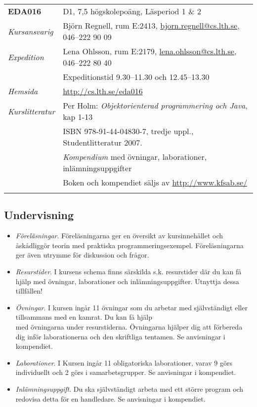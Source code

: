 \begin{longtable}[c]{@{}ll@{}}
\toprule\addlinespace
\textbf{EDA016} & D1, 7,5 högskolepoäng, Läsperiod 1 \& 2
\\\addlinespace
\midrule\endhead
\emph{Kursansvarig} & Björn Regnell, rum E:2413,
\href{mailto:bjorn.regnell@cs.lth.se}{bjorn.regnell@cs.lth.se}, 046--222
90 09
\\\addlinespace
\emph{Expedition} & Lena Ohlsson, rum E:2179,
\href{mailto:lena.ohlsson@cs.lth.se}{lena.ohlsson@cs.lth.se}, 046--222
80 40
\\\addlinespace
& Expeditionstid 9.30--11.30 och 12.45--13.30
\\\addlinespace
\emph{Hemsida} & \url{http://cs.lth.se/eda016}
\\\addlinespace
\emph{Kurslitteratur} & Per Holm: \emph{Objektorienterad programmering
och Java}, kap 1-13
\\\addlinespace
& ISBN 978-91-44-04830-7, tredje uppl., Studentlitteratur 2007.
\\\addlinespace
& \emph{Kompendium} med övningar, laborationer, inlämningsuppgifter
\\\addlinespace
& Boken och kompendiet säljs av \url{http://www.kfsab.se/}
\\\addlinespace
\bottomrule
\end{longtable}

\subsection{Undervisning}\label{undervisning}

\begin{itemize}
\item
  \emph{Föreläsningar}. Föreläsningarna ger en översikt av
  kursinnehållet och åskådliggör teorin med praktiska
  programmeringsexempel. Föreläsningarna ger även utrymme för diskussion
  och frågor.
\item
  \emph{Resurstider}. I kursens schema finns särskilda s.k. resurstider
  där du kan få hjälp med övningar, laborationer och
  inlämningsuppgifter. Utnyttja dessa tillfällen!
\item
  \emph{Övningar}. I kursen ingår 11 övningar som du arbetar med
  självständigt eller tillsammans med en kamrat. Du kan få hjälp\\med
  övningarna under resurstiderna. Övningarna hjälper dig att förbereda
  dig inför laborationerna och den skriftliga tentamen. Se anvisningar i
  kompendiet.
\item
  \emph{Laborationer}. I Kursen ingår 11 obligatoriska laborationer,
  varav 9 görs individuellt och 2 görs i samarbetsgrupper. Se
  anvisningar i kompendiet.
\item
  \emph{Inlämningsuppgift}. Du ska självständigt arbeta med ett större
  program och redovisa detta för en handledare. Se anvisningar i
  kompendiet.
\end{itemize}

